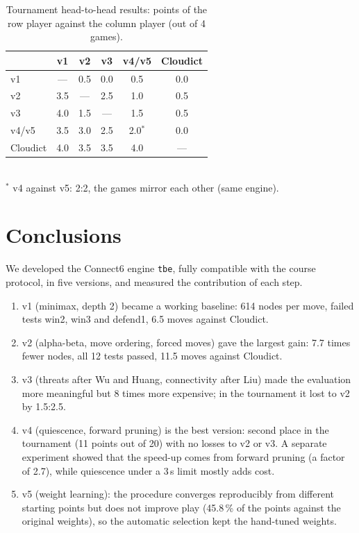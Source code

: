 \documentclass[a4paper,10pt,twocolumn]{article}
\newenvironment{points}{\begin{enumerate}[label=(\arabic*),leftmargin=*,itemsep=2pt,topsep=3pt]}{\end{enumerate}}
\newcommand{\code}[1]{\texttt{#1}}
\begin{document}
\begin{table}[t]
\centering
\caption{Tournament head-to-head results: points of the row player against the column player (out of 4 games).}
\label{tab:h2h}
\begin{tabular}{@{}lccccc@{}}
\toprule
& v1 & v2 & v3 & v4/v5 & Cloudict \\
\midrule
v1 & --- & 0.5 & 0.0 & 0.5 & 0.0 \\
v2 & 3.5 & --- & 2.5 & 1.0 & 0.5 \\
v3 & 4.0 & 1.5 & --- & 1.5 & 0.5 \\
v4/v5 & 3.5 & 3.0 & 2.5 & 2.0$^{*}$ & 0.0 \\
Cloudict & 4.0 & 3.5 & 3.5 & 4.0 & --- \\
\bottomrule
\end{tabular}\\[2pt]
{\footnotesize $^{*}$ v4 against v5: 2:2, the games mirror each other (same engine).}
\end{table}

\section{Conclusions}\label{sec:concl}

We developed the Connect6 engine \code{tbe}, fully compatible with the course protocol, in five versions, and measured the contribution of each step.
\begin{points}
\item v1 (minimax, depth 2) became a working baseline: 614 nodes per move, failed tests win2, win3 and defend1, 6.5 moves against Cloudict.
\item v2 (alpha-beta, move ordering, forced moves) gave the largest gain: 7.7 times fewer nodes, all 12 tests passed, 11.5 moves against Cloudict.
\item v3 (threats after Wu and Huang, connectivity after Liu) made the evaluation more meaningful but 8 times more expensive; in the tournament it lost to v2 by 1.5:2.5.
\item v4 (quiescence, forward pruning) is the best version: second place in the tournament (11 points out of 20) with no losses to v2 or v3. A separate experiment showed that the speed-up comes from forward pruning (a factor of 2.7), while quiescence under a 3\,s limit mostly adds cost.
\item v5 (weight learning): the procedure converges reproducibly from different starting points but does not improve play (45.8\,\% of the points against the original weights), so the automatic selection kept the hand-tuned weights.
\end{points}
\end{document}
